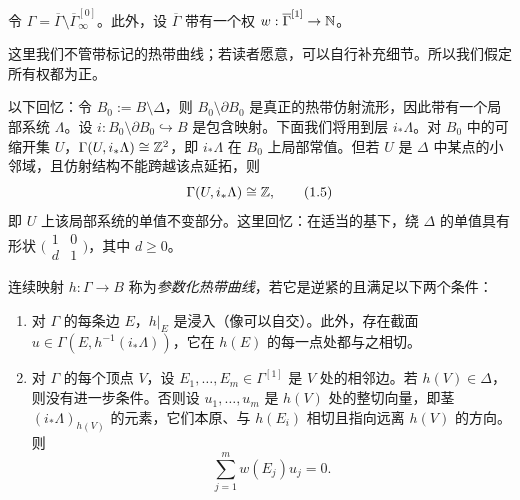 令 $\Gamma = \overline{\Gamma} \setminus \overline{\Gamma}^{[0]}_\infty$。此外，设 $\overline{\Gamma}$ 带有一个权
$w : \overline{\Gamma}^{[1]} \to \mathbb{N}$。

这里我们不管带标记的热带曲线；若读者愿意，可以自行补充细节。所以我们假定所有权都为正。

以下回忆：令 $B_0 := B\setminus\Delta$，则 $B_0\setminus\partial B_0$ 是真正的热带仿射流形，因此带有一个局部系统
$\Lambda$。设 $i : B_0\setminus\partial B_0 \hookrightarrow B$ 是包含映射。下面我们将用到层 $i_*\Lambda$。对
$B_0$ 中的可缩开集 $U$，$\Gamma(U, i_*\Lambda) \cong \mathbb{Z}^2$，即 $i_*\Lambda$ 在 $B_0$ 上局部常值。但若 $U$ 是
$\Delta$ 中某点的小邻域，且仿射结构不能跨越该点延拓，则
\begin{equation}
\Gamma(U, i_*\Lambda) \cong \mathbb{Z}, \tag{1.5}
\end{equation}
即 $U$ 上该局部系统的单值不变部分。这里回忆：在适当的基下，绕 $\Delta$ 的单值具有形状
$\bigl(\begin{smallmatrix}1&0\\ d&1\end{smallmatrix}\bigr)$，其中 $d\ge0$。



\begin{definition}
连续映射 $h : \Gamma \to B$ 称为\emph{参数化热带曲线}，若它是逆紧的且满足以下两个条件：
\begin{enumerate}[label=(\arabic*),leftmargin=*]
\item 对 $\Gamma$ 的每条边 $E$，$h|_E$ 是浸入（像可以自交）。此外，存在截面
$u\in\Gamma(E, h^{-1}(i_*\Lambda))$，它在 $h(E)$ 的每一点处都与之相切。
\item 对 $\Gamma$ 的每个顶点 $V$，设 $E_1,\dots,E_m\in\Gamma^{[1]}$ 是 $V$ 处的相邻边。若
$h(V)\in\Delta$，则没有进一步条件。否则设 $u_1,\dots,u_m$ 是 $h(V)$ 处的整切向量，即茎
$(i_*\Lambda)_{h(V)}$ 的元素，它们本原、与 $h(E_i)$ 相切且指向远离 $h(V)$ 的方向。则
\[
\sum_{j=1}^m w(E_j)u_j = 0.
\]
\end{enumerate}
\end{definition}

